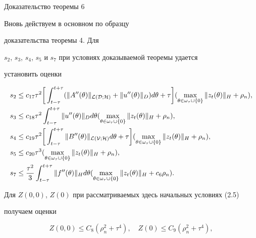 \begin{pf*}{Доказательство теоремы 6}


Вновь действуем в основном по образцу


доказательства теоремы 4. Для


$s_2$, $s_3$, $s_4$, $s_5$ и $s_7$ при условиях доказываемой теоремы удается


установить оценки


\begin{align}


s_2&\le c_{17}\tau^2\bigg[\int_{t-\tau}^{t+\tau}


(\|A''(\theta)\|_{\cal L(D;H)}+


\|u''(\theta)\|_D)d\theta+\tau\bigg](\max\limits_


{\theta\in\omega_{\tau}\cup\{0\}}\|z_t(\theta)\|_H+\rho_n),\\


s_3&\le c_{18}\tau^2\int_{t-\tau}^{t+\tau}


\|u''(\theta)\|_Dd\theta(\max\limits_


{\theta\in\omega_{\tau}\cup\{0\}}\|z_t(\theta)\|_H+\rho_n),\\


s_4&\le c_{19}\tau^2\bigg[\int_{t-\tau}^{t+\tau}


\|B''(\theta)\|_{\cal L(V;H)}d\theta+\tau\bigg](\max\limits_


{\theta\in\omega_{\tau}\cup\{0\}}\|z_t(\theta)\|_H+\rho_n),\\


s_5&\le c_{20}\tau^3(\max\limits_


{\theta\in\omega_{\tau}\cup\{0\}}\|z_t(\theta)\|_H+\rho_n),\\


s_7&\le \frac{\tau^2}3\int_{t-\tau}^{t+\tau}


\|f''(\theta)\|_Hd\theta(\max\limits_


{\theta\in\omega_{\tau}\cup\{0\}}\|z_t(\theta)\|_H+c_6\rho_n).


\end{align}


Для $Z(0,0)$, $Z(0)$ при рассматриваемых здесь начальных условиях (2.5)


получаем оценки


\begin{equation}


Z(0,0)\le C_8(\rho_n^2+\tau^4),


\quad Z(0)\le C_9(\rho_n^2+\tau^4),



\end{equation}
\end{pf*}
